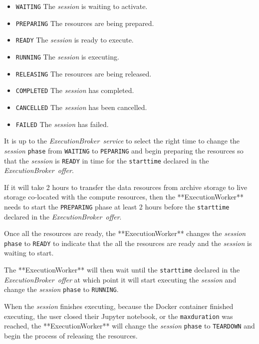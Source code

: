 \documentclass[11pt,a4paper]{ivoa}
\newcommand{\execworkerclass} {**ExecutionWorker**}
\newcommand{\execbrokerservice}[1] {\textit{ExecutionBroker~service#1}}
\newcommand{\execoffer}[1] {\textit{ExecutionBroker~offer#1}}
\newcommand{\workerjob}[1] {\textit{session#1}}
\newcommand{\jupyternotebook} {Jupyter notebook}
\newcommand{\dockercontainer} {Docker container}
\newcommand{\codeword}[1] {\texttt{#1}}
\begin{document}
\begin{itemize}
    \item \codeword{WAITING}    The \workerjob{} is waiting to activate.
    \item \codeword{PREPARING}  The resources are being prepared.
    \item \codeword{READY}      The \workerjob{} is ready to execute.
    \item \codeword{RUNNING}    The \workerjob{} is executing.
    \item \codeword{RELEASING}  The resources are being released.
    \item \codeword{COMPLETED}  The \workerjob{} has completed.
    \item \codeword{CANCELLED}  The \workerjob{} has been cancelled.
    \item \codeword{FAILED}     The \workerjob{} has failed.
\end{itemize}






It is up to the \execbrokerservice{} to select the right time to change the \workerjob{}
\codeword{phase} from \codeword{WAITING} to \codeword{PEPARING} and begin preparing the resources so that
the \workerjob{} is \codeword{READY} in time for the \codeword{starttime} declared
in the \execoffer{}.

If it will take 2 hours to transfer the data resources
from archive storage to live storage co-located with the compute resources,
then the \execworkerclass{} needs to start the \codeword{PREPARING} phase at least 2 hours
before the \codeword{starttime} declared in the \execoffer{}.

Once all the resources are ready, the \execworkerclass{} changes the \workerjob{}
\codeword{phase} to \codeword{READY} to indicate that the all the resources
are ready and the \workerjob{} is waiting to start.

The \execworkerclass{} will then wait until the \codeword{starttime} declared in the \execoffer{}
at which point it will start executing the \workerjob{} and change the \workerjob{} \codeword{phase}
to \codeword{RUNNING}.

When the \workerjob{} finishes executing, because the \dockercontainer{} finished executing,
the user closed their \jupyternotebook, or the \codeword{maxduration} was reached,
the \execworkerclass{} will change the \workerjob{} \codeword{phase} to \codeword{TEARDOWN} and
begin the process of releasing the resources.
\end{document}
